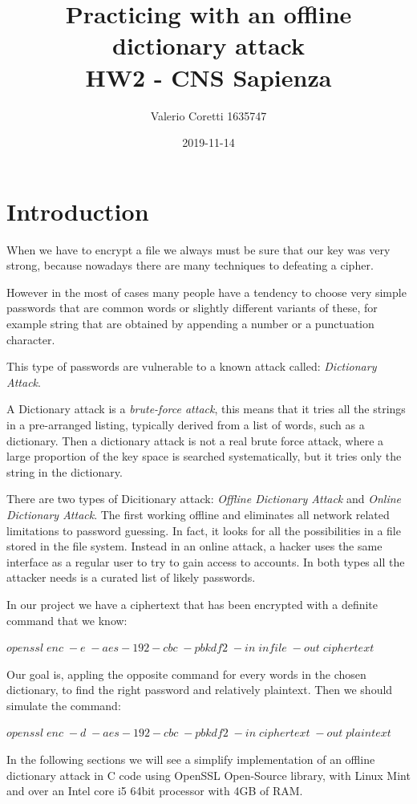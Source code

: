 \documentclass[11pt]{article}
\title{{\bf Practicing with an offline dictionary attack} \\ \bigskip \large HW2 - CNS Sapienza}
\date{2019-11-14}
\author{Valerio Coretti 1635747}
\begin{document}
\maketitle

\section{Introduction}
When we have to encrypt a file we always must be sure that our key was very strong, because nowadays there are many techniques to defeating a cipher.

However in the most of cases many people have a tendency to choose very simple passwords that are common words or slightly different variants of these, for example string that are obtained by appending a number or a punctuation character.

This type of passwords are vulnerable to a known attack called: {\em Dictionary Attack}.

A Dictionary attack is a {\em brute-force attack}, this means that it tries all the strings in a pre-arranged listing, typically derived from a list of words, such as a dictionary. Then a dictionary attack is not a real brute force attack, where a large proportion of the key space is searched systematically, but it tries only the string in the dictionary.

There are two types of Dicitionary attack: {\em Offline Dictionary Attack} and {\em Online Dictionary Attack}. The first working offline and eliminates all network related limitations to password guessing. In fact, it looks for all the possibilities in a file stored in the file system. Instead in an online attack, a hacker uses the same interface as a regular user to try to gain access to accounts. In both types all the attacker needs is a curated list of likely passwords.

In our project we have a ciphertext that has been encrypted with a definite command that we know:

\bigskip
$ openssl\;enc\;-e\;-aes-192-cbc\;-pbkdf2\;-in\;infile\;-out\;ciphertext $
\bigskip

Our goal is, appling the opposite command for every words in the chosen dictionary, to find the right password and relatively plaintext. Then we should simulate the command:

\bigskip
$ openssl\;enc\;-d\;-aes-192-cbc\;-pbkdf2\;-in\;ciphertext\;-out\;plaintext $
\bigskip

In the following sections we will see a simplify implementation of an offline dictionary attack in C code using OpenSSL Open-Source library, with Linux Mint and over an Intel core i5 64bit processor with 4GB of RAM.
\end{document}

